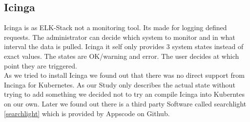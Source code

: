 \subsection{Icinga}
\label{Icinga}
Icinga is as ELK-Stack not a monitoring tool. Its made for logging defined requests. The administrator can decide which system to monitor and in what interval the data is pulled.
Icinga it self only provides 3 system states instead of exact values. The states are OK/warning and error. The user decides at which point they are triggered.\\
As we tried to install Icinga we found out that there was no direct support from Incinga for Kubernetes. As our Study only describes the actual state without trying to add something we decided not to try an compile Icinga into Kuberntes on our own. Later we found out there is a third party Software called searchlight \ref{searchlight} which is provided by Appscode on Github.
 
